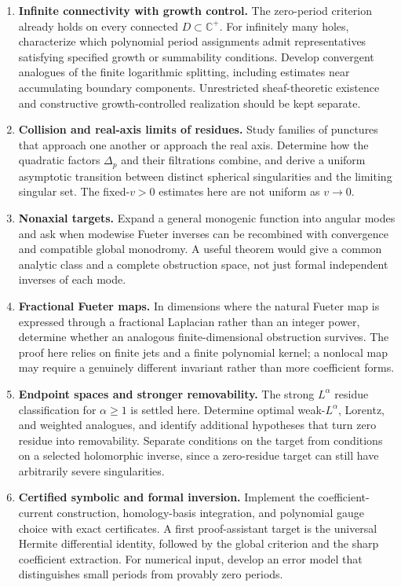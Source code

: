 \documentclass[11pt,a4paper]{article}
\numberwithin{equation}{section}
\theoremstyle{definition}
\theoremstyle{remark}
\newcommand{\C}{\mathbb C}
\begin{document}
\begin{enumerate}[label=\textbf{\arabic*.},leftmargin=2em,itemsep=7pt]
\item \textbf{Infinite connectivity with growth control.}
The zero-period criterion already holds on every connected $D\subset\C^+$.
For infinitely many holes, characterize which polynomial period assignments
admit representatives satisfying specified growth or summability conditions.
Develop convergent analogues of the finite logarithmic splitting, including
estimates near accumulating boundary components. Unrestricted sheaf-theoretic
existence and constructive growth-controlled realization should be kept
separate.

\item \textbf{Collision and real-axis limits of residues.}
Study families of punctures that approach one another or approach the real
axis. Determine how the quadratic factors $\Delta_p$ and their filtrations
combine, and derive a uniform asymptotic transition between distinct spherical
singularities and the limiting singular set. The fixed-$v>0$ estimates here
are not uniform as $v\to0$.

\item \textbf{Nonaxial targets.}
Expand a general monogenic function into angular modes and ask when modewise
Fueter inverses can be recombined with convergence and compatible global
monodromy. A useful theorem would give a common analytic class and a complete
obstruction space, not just formal independent inverses of each mode.

\item \textbf{Fractional Fueter maps.}
In dimensions where the natural Fueter map is expressed through a fractional
Laplacian rather than an integer power, determine whether an analogous
finite-dimensional obstruction survives. The proof here relies on finite
jets and a finite polynomial kernel; a nonlocal map may require a genuinely
different invariant rather than more coefficient forms.

\item \textbf{Endpoint spaces and stronger removability.}
The strong $L^\alpha$ residue classification for $\alpha\ge1$ is settled here.
Determine optimal weak-$L^\alpha$, Lorentz, and weighted analogues, and identify
additional hypotheses that turn zero residue into removability. Separate
conditions on the target from conditions on a selected holomorphic inverse,
since a zero-residue target can still have arbitrarily severe singularities.

\item \textbf{Certified symbolic and formal inversion.}
Implement the coefficient-current construction, homology-basis integration,
and polynomial gauge choice with exact certificates. A first proof-assistant
target is the universal Hermite differential identity, followed by the global
criterion and the sharp coefficient extraction. For numerical input, develop
an error model that distinguishes small periods from provably zero periods.
\end{enumerate}
\end{document}
